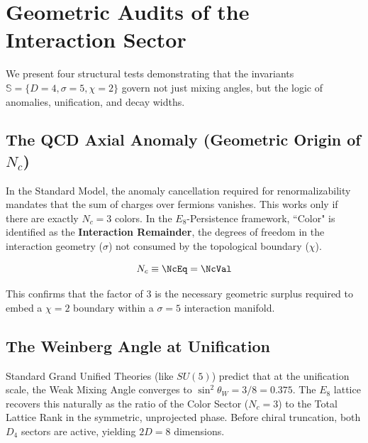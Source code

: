 
\appendix
{}
\section{Geometric Audits of the Interaction Sector}

We present four structural tests demonstrating that the invariants $\mathbb{S} = \{D=4, \sigma=5, \chi=2\}$ govern not just mixing angles, but the logic of anomalies, unification, and decay widths.

\subsection{The QCD Axial Anomaly (Geometric Origin of \texorpdfstring{$N_c$}{Nc})}
In the Standard Model, the anomaly cancellation required for renormalizability mandates that the sum of charges over fermions vanishes. This works only if there are exactly $N_c=3$ colors. In the $E_8$-Persistence framework, ``Color" is identified as the \textbf{Interaction Remainder}, the degrees of freedom in the interaction geometry ($\sigma$) not consumed by the topological boundary ($\chi$).

\begin{equation}
    N_c \equiv \NcEq = \NcVal
\end{equation}

This confirms that the factor of 3 is the necessary geometric surplus required to embed a $\chi=2$ boundary within a $\sigma=5$ interaction manifold.

\subsection{The Weinberg Angle at Unification}
Standard Grand Unified Theories (like $SU(5)$) predict that at the unification scale, the Weak Mixing Angle converges to $\sin^2 \theta_W = 3/8 = 0.375$. The $E_8$ lattice recovers this naturally as the ratio of the Color Sector ($N_c=3$) to the Total Lattice Rank in the symmetric, unprojected phase. Before chiral truncation, both $D_4$ sectors are active, yielding $2D=8$ dimensions.

